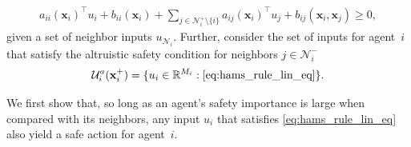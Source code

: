 \documentclass[letterpaper, 10 pt, conference]{ieeeconf}  %
\theoremstyle{plain}
\begin{document}
\small
\begin{equation}\label{eq:safe_cond_separated}
    \begin{aligned}
        a_{ii}(\mathbf{x}_i)^\top u_i + b_{ii}(\mathbf{x}_i) + \sum_{j \in \mathcal{N}_i^+ \setminus \{i\}} a_{ij}(\mathbf{x}_i)^\top u_j  +  b_{ij}(\mathbf{x}_i,\mathbf{x}_j) \geq 0,
    \end{aligned}
\end{equation}
\normalsize
given a set of neighbor inputs $u_{\mathcal{N}_i}$.
Further, consider the set of inputs for agent~$i$ that satisfy the altruistic safety condition for neighbors $j \in \mathcal{N}_i^-$
\begin{equation}
    \mathcal{U}_i^a(\mathbf{x}_i^+) = \{ u_i \in \mathbb{R}^{M_i}: \eqref{eq:hams_rule_lin_eq} \}.
\end{equation}

We first show that, so long as an agent's safety importance is large when compared with its neighbors, any input $u_i$ that satisfies \eqref{eq:hams_rule_lin_eq} 
also yield a safe action for agent~$i$.
\end{document}
